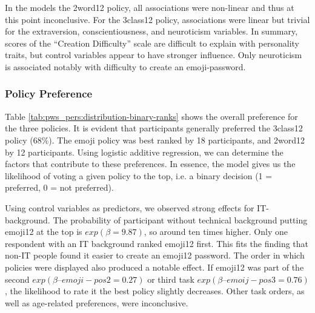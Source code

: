 
In the models the 2word12 policy, all associations were non-linear and thus at this point inconclusive. For the 3class12 policy, associations were linear but trivial for the extraversion, conscientiousness, and neuroticism variables. In summary, scores of the ``Creation Difficulty'' scale are difficult to explain with personality traits, but control variables appear to have stronger influence. Only neuroticism is associated notably with difficulty to create an emoji-password.

\subsubsection{Policy Preference}
Table \ref{tab:pws_pers:distribution-binary-ranks} shows the overall preference for the three policies. It is evident that participants generally preferred the 3class12 policy (68\%). The emoji policy was best ranked by 18 participants, and 2word12 by 12 participants. Using logistic additive regression, we can determine the factors that contribute to these preferences. %
In essence, the model gives us the likelihood of voting a given policy to the top, i.e. a binary decision (1 = preferred, 0 = not preferred). 

Using control variables as predictors, we observed strong effects for IT-background. The probability of participant without technical background putting emoji12 at the top is $exp(\beta=9.87)$, so around ten times higher. Only one respondent with an IT background ranked emoji12 first. This fits the finding that non-IT people found it easier to create an emoji12 password.
The order in which policies were displayed also produced a notable effect. If emoji12 was part of the second $exp(\beta–{emoji-pos2}=0.27)$ or third task $exp(\beta–{emoij-pos3}=0.76)$, the likelihood to rate it the best policy slightly decreases. Other task orders, as well as age-related preferences, were inconclusive.

